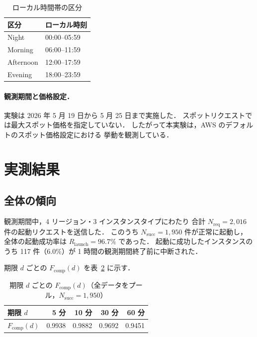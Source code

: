 \documentclass[11pt,a4paper]{ltjsreport}
\newcommand{\Fcomp}{F_{\mathrm{comp}}}
\newcommand{\Rlaunch}{R_{\mathrm{launch}}}
\newcommand{\Nreq}{N_{\mathrm{req}}}
\newcommand{\Nsucc}{N_{\mathrm{succ}}}
\begin{document}
\begin{table}[htbp]
\centering
\caption{ローカル時間帯の区分}
\label{tab:periods}
\small
\begin{tabular}{@{}ll@{}}
\toprule
区分 & ローカル時刻 \\
\midrule
Night     & 00:00--05:59 \\
Morning   & 06:00--11:59 \\
Afternoon & 12:00--17:59 \\
Evening   & 18:00--23:59 \\
\bottomrule
\end{tabular}
\end{table}

\paragraph{観測期間と価格設定．}
実験は 2026 年 5 月 19 日から 5 月 25 日まで実施した．
スポットリクエストでは最大スポット価格を指定していない．
したがって本実験は，AWS のデフォルトのスポット価格設定における
挙動を観測している．

\section{実測結果}

\subsection{全体の傾向}

観測期間中，4 リージョン・3 インスタンスタイプにわたり
合計 $\Nreq = 2{,}016$ 件の起動リクエストを送信した．
このうち $\Nsucc = 1{,}950$ 件が正常に起動し，
全体の起動成功率は $\Rlaunch = 96.7\%$ であった．
起動に成功したインスタンスのうち 117 件（$6.0\%$）が
1 時間の観測期間終了前に中断された．

期限 $d$ ごとの $\Fcomp(d)$ を表~\ref{tab:fcomp_overall} に示す．

\begin{table}[htbp]
\centering
\caption{期限 $d$ ごとの $\Fcomp(d)$（全データをプール，$\Nsucc = 1{,}950$）}
\label{tab:fcomp_overall}
\small
\begin{tabular}{@{}lrrrr@{}}
\toprule
期限 $d$ & 5 分 & 10 分 & 30 分 & 60 分 \\
\midrule
$\Fcomp(d)$ & 0.9938 & 0.9882 & 0.9692 & 0.9451 \\
\bottomrule
\end{tabular}
\end{table}
\end{document}
